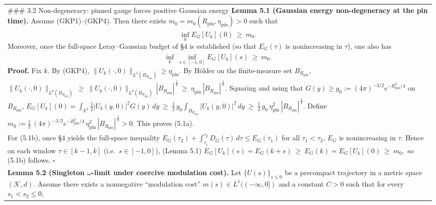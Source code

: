\documentclass[
  11pt,
]{article}
\begin{document}
\begin{longtable}[]{@{}
  >{\raggedright\arraybackslash}p{}@{}}
\toprule
\endhead
\#\#\# 3.2 Non-degeneracy: pinned gauge forces positive Gaussian energy \textbf{Lemma 5.1 (Gaussian energy non-degeneracy at the pin time).} Assume (GKP1)--(GKP4). Then there exists \(m_0=m_0(R_{\mathrm{pin}},\eta_{\mathrm{pin}})>0\) such that \\
\begin{equation}
\inf_k E_G[U_k](0)\ \ge\ m_0.
\tag{5.1a}
\end{equation}
Moreover, once the full-space Leray--Gaussian budget of §4 is established (so that \(E_G(\tau)\) is nonincreasing in \(\tau\)), one also has \\
\begin{equation}
\inf_k\ \inf_{s\in[-1,0]} E_G[U_k](s)\ \ge\ m_0.
\tag{5.1b}
\end{equation}
\textbf{Proof.} Fix \(k\). By (GKP4), \(
\|U_k(\cdot,0)\|_{L^3(B_{R_{\mathrm{pin}}})}\ge \eta_{\mathrm{pin}}.
\) By Hölder on the finite-measure set \(B_{R_{\mathrm{pin}}}\), \(
\|U_k(\cdot,0)\|_{L^2(B_{R_{\mathrm{pin}}})}
\ \ge\
\|U_k(\cdot,0)\|_{L^3(B_{R_{\mathrm{pin}}})}\,|B_{R_{\mathrm{pin}}}|^{\,\frac16}
\ \ge\ \eta_{\mathrm{pin}}\,|B_{R_{\mathrm{pin}}}|^{\,\frac16}.
\) Squaring and using that \(G(y)\ge g_0:=(4\pi)^{-3/2}e^{-R_{\mathrm{pin}}^2/4}\) on \(B_{R_{\mathrm{pin}}}\), \(
E_G[U_k](0)
=\int_{\mathbb R^3}\tfrac12|U_k(y,0)|^2G(y)\,dy
\ \ge\
\frac12\,g_0\int_{B_{R_{\mathrm{pin}}}}|U_k(y,0)|^2\,dy
\ \ge\
\frac12\,g_0\,\eta_{\mathrm{pin}}^2\,|B_{R_{\mathrm{pin}}}|^{\,\frac13}.
\) Define \(
m_0:=\frac12\,(4\pi)^{-3/2}e^{-R_{\mathrm{pin}}^2/4}\,\eta_{\mathrm{pin}}^2\,|B_{R_{\mathrm{pin}}}|^{\,\frac13}>0.
\) This proves (5.1a). \\
For (5.1b), once §4 yields the full-space inequality \(E_G(\tau_2)+\int_{\tau_1}^{\tau_2}D_G(\tau)\,d\tau\le E_G(\tau_1)\) for all \(\tau_1<\tau_2\), \(E_G\) is nonincreasing in \(\tau\). Hence on each window \(\tau\in[k-1,k]\) (i.e.~\(s\in[-1,0]\)), (Lemma 5.1) \(
E_G[U_k](s)=E_G(k+s)\ \ge\ E_G(k)=E_G[U_k](0)\ \ge\ m_0,
\) so (5.1b) follows. \(\square\) \\
\textbf{Lemma 5.2 (Singleton \(\omega\)-limit under coercive modulation cost).} Let \(\{U(s)\}_{s\le 0}\) be a precompact trajectory in a metric space \((\mathcal K,d)\). Assume there exists a nonnegative ``modulation cost'' \(m(s)\in L^1((-\infty,0])\) and a constant \(C>0\) such that for every \(s_1<s_2\le 0\), \\

\end{longtable}
\end{document}
